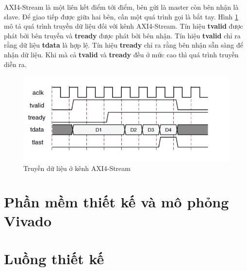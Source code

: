 AXI4-Stream là một liên kết điểm tới điểm, bên gửi là master còn bên nhận là slave. Để giao tiếp được giữa hai bên, cần một quá trình gọi là bắt tay. Hình \ref{fig:axi4} mô tả quá trình truyền dữ liệu đối với kênh AXI4-Stream. Tín hiệu \textbf{tvalid} được phát bởi bên truyền và \textbf{tready} được phát bởi bên nhận. Tín hiệu \textbf{tvalid} chỉ ra rằng dữ liệu \textbf{tdata} là hợp lệ. Tín hiệu \textbf{tready} chỉ ra rằng bên nhận sẵn sàng để nhận dữ liệu. Khi mà cả \textbf{tvalid} và \textbf{tready} đều ở mức cao thì quá trình truyền diễn ra.


\begin{figure}[!ht]
    \centering
    \includegraphics[width=\linewidth]{figures/axi4.png}
    \caption{Truyền dữ liệu ở kênh AXI4-Stream}
    \label{fig:axi4}
\end{figure}
\section{Phần mềm thiết kế và mô phỏng Vivado}
\section{Luồng thiết kế}